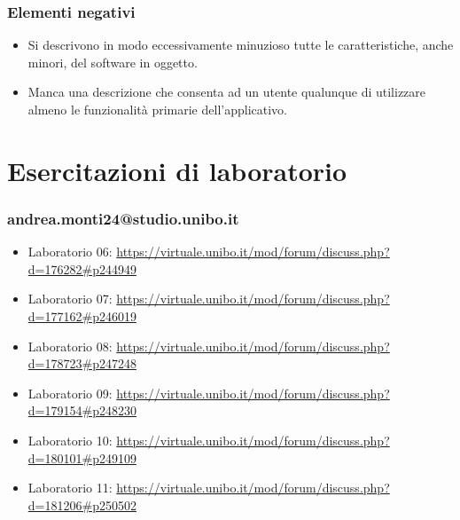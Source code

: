 \documentclass[a4paper,12pt]{report}
\begin{document}
\subsection*{Elementi negativi}
\begin{itemize}
 \item Si descrivono in modo eccessivamente minuzioso tutte le caratteristiche, anche minori, del software in oggetto.
 \item Manca una descrizione che consenta ad un utente qualunque di utilizzare almeno le funzionalità primarie dell'applicativo.
\end{itemize}

\chapter{Esercitazioni di laboratorio}

\subsection{andrea.monti24@studio.unibo.it}

\begin{itemize}
 \item Laboratorio 06: \url{https://virtuale.unibo.it/mod/forum/discuss.php?d=176282#p244949}
 \item Laboratorio 07: \url{https://virtuale.unibo.it/mod/forum/discuss.php?d=177162#p246019}
 \item Laboratorio 08: \url{https://virtuale.unibo.it/mod/forum/discuss.php?d=178723#p247248}
 \item Laboratorio 09: \url{https://virtuale.unibo.it/mod/forum/discuss.php?d=179154#p248230}
 \item Laboratorio 10: \url{https://virtuale.unibo.it/mod/forum/discuss.php?d=180101#p249109}
 \item Laboratorio 11: \url{https://virtuale.unibo.it/mod/forum/discuss.php?d=181206#p250502}
\end{itemize}
\end{document}

